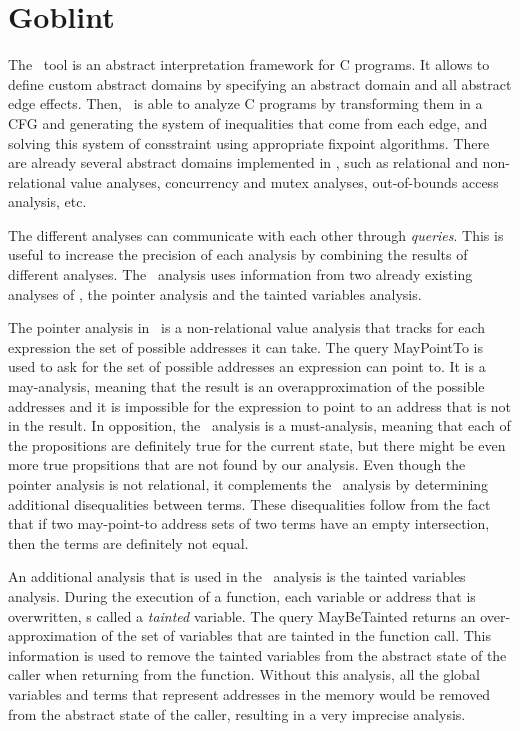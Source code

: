 \section{Goblint}

The \goblint\ tool is an abstract interpretation framework for C programs.
It allows to define custom abstract domains by specifying an abstract domain and all abstract edge effects.
Then, \goblint\ is able to analyze C programs by transforming them in a CFG and
generating the system of inequalities that come from each edge, and solving
this system of consstraint using appropriate fixpoint algorithms.
There are already several abstract domains implemented in \goblint, such as
relational and non-relational value analyses, concurrency and mutex analyses,
out-of-bounds access analysis, etc.

The different analyses can communicate with each other through \emph{queries}.
This is useful to increase the precision of each analysis by combining the results of different analyses.
The \cpo\ analysis uses information from two already existing analyses of \goblint, the pointer analysis and the tainted variables analysis.

The pointer analysis in \goblint\ is a non-relational value analysis that tracks for each expression the set of possible addresses it can take.
The query \textsf{MayPointTo} is used to ask for the set of possible addresses an expression can point to.
It is a may-analysis, meaning that the result is an overapproximation of the possible addresses and it is impossible for the expression to point to an address that is not in the result.
In opposition, the \cpo\ analysis is a must-analysis, meaning that each of the propositions
are definitely true for the current state, but there might be even more true propsitions that are not found by our analysis.
Even though the pointer analysis is not relational, it complements the \cpo\ analysis
by determining additional disequalities between terms.
These disequalities follow from the fact that if two may-point-to address sets of two terms
have an empty intersection, then the terms are definitely not equal.


An additional analysis that is used in the \cpo\ analysis is the tainted variables analysis.
During the execution of a function, each variable or address that is overwritten, s called a \emph{tainted} variable.
The query \textsf{MayBeTainted} returns an over-approximation of the set of variables that are tainted in the function call.
This information is used to remove the tainted variables from the abstract state of the caller when returning from the function.
Without this analysis, all the global variables and terms that represent addresses in the memory would be removed from the abstract state of the caller, resulting in a very imprecise analysis.
